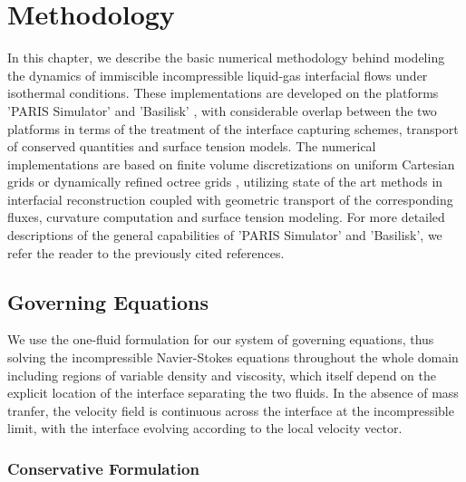 \setchapterpreamble[u]{\margintoc}
\chapter{Methodology}

In this chapter, we describe the basic numerical methodology behind modeling 
the dynamics of immiscible incompressible liquid-gas interfacial flows under isothermal conditions. 
These implementations are developed on the platforms 'PARIS Simulator' \cite{paris} and 
'Basilisk' \cite{basilisk}, with considerable overlap between the two platforms in terms 
of the treatment of the interface capturing schemes, transport of conserved quantities and surface tension models.
The numerical implementations are based on finite volume discretizations on uniform Cartesian grids or dynamically refined octree grids , utilizing
state of the art methods in interfacial reconstruction coupled with geometric
transport of the corresponding fluxes, curvature computation and surface tension modeling. For more detailed
descriptions of the general capabilities of 'PARIS Simulator’ and 'Basilisk', we refer the reader to the previously cited references. 


\section{Governing Equations}

We use the one-fluid formulation for our system of governing equations, thus solving 
the incompressible Navier-Stokes equations throughout the whole domain including regions 
of variable density and viscosity, which itself depend on the explicit 
location of the interface separating the two fluids.
In the absence of mass tranfer, the velocity field is continuous across
the interface at the incompressible limit, with the interface evolving according to the local velocity vector.  

\subsection*{Conservative Formulation}

